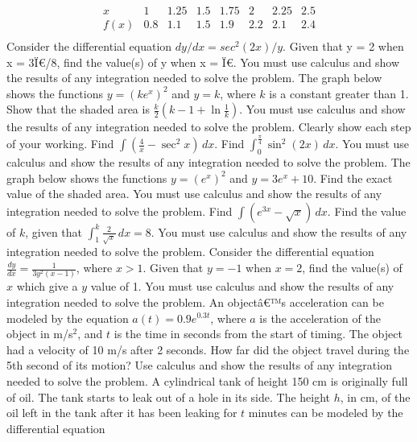 \documentclass[12pt,addpoints]{exam}
\begin{document}
\begin{questions}
\[
\begin{array}{c|ccccccc}
x & 1 & 1.25 & 1.5 & 1.75 & 2 & 2.25 & 2.5 \\
\hline
f(x) & 0.8 & 1.1 & 1.5 & 1.9 & 2.2 & 2.1 & 2.4 \\
\end{array}
\]
\fillwithlines{3cm}
\question[5] Consider the differential equation \(dy/dx = sec^2(2x) / y\). Given that y = 2 when x = 3Ï€/8, find the value(s) of y when x = Ï€. You must use calculus and show the results of any integration needed to solve the problem.
\fillwithlines{3cm}
\question[5] The graph below shows the functions \( y = (ke^x)^2 \) and \( y = k \), where \( k \) is a constant greater than 1. Show that the shaded area is \(\frac{k}{2} \left( k - 1 + \ln \frac{1}{k} \right)\). You must use calculus and show the results of any integration needed to solve the problem. Clearly show each step of your working.
\fillwithlines{3cm}
\question[5] Find \(\int \left( \frac{4}{x} - \sec^2 x \right) \, dx\).
\fillwithlines{3cm}
\question[5] Find \(\int_{0}^{\frac{\pi}{4}} \sin^2(2x) \, dx\). You must use calculus and show the results of any integration needed to solve the problem.
\fillwithlines{3cm}
\question[5] The graph below shows the functions \( y = (e^x)^2 \) and \( y = 3e^x + 10 \). Find the exact value of the shaded area. You must use calculus and show the results of any integration needed to solve the problem.
\fillwithlines{3cm}
\question[5] Find \(\int (e^{3x} - \sqrt{x}) \, dx\).
\fillwithlines{3cm}
\question[5] Find the value of \( k \), given that \(\int_{1}^{k} \frac{2}{\sqrt{x}} \, dx = 8\). You must use calculus and show the results of any integration needed to solve the problem.
\fillwithlines{3cm}
\question[5] Consider the differential equation \( \frac{dy}{dx} = \frac{1}{3y^2(x-1)} \), where \( x > 1 \). Given that \( y = -1 \) when \( x = 2 \), find the value(s) of \( x \) which give a \( y \) value of 1. You must use calculus and show the results of any integration needed to solve the problem.
\fillwithlines{3cm}
\question[5] An objectâ€™s acceleration can be modeled by the equation \( a(t) = 0.9e^{0.3t} \), where \( a \) is the acceleration of the object in m/s\(^2\), and \( t \) is the time in seconds from the start of timing. The object had a velocity of 10 m/s after 2 seconds. How far did the object travel during the 5th second of its motion? Use calculus and show the results of any integration needed to solve the problem.
\fillwithlines{3cm}
\question[5] A cylindrical tank of height 150 cm is originally full of oil. The tank starts to leak out of a hole in its side. The height \( h \), in cm, of the oil left in the tank after it has been leaking for \( t \) minutes can be modeled by the differential equation


\end{questions}
\end{document}
